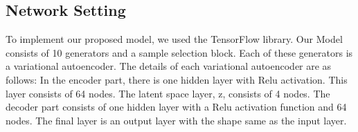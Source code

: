\documentclass{article}
\begin{document}
\newpage
\noindent
\begin{appendices}
\section{Network Setting}
To implement our proposed model, we used the TensorFlow library. Our Model consists of 10 generators and a sample selection block. Each of these generators is a variational autoencoder.
The details of each variational autoencoder are as follows:
In the encoder part, there is one hidden layer with Relu activation. This layer consists of 64 nodes.
The latent space layer, z, consists of 4 nodes.
The decoder part consists of one hidden layer with a Relu activation function and 64 nodes. The final layer is an output layer with the shape same as the input layer.
\end{appendices}
\end{document}
